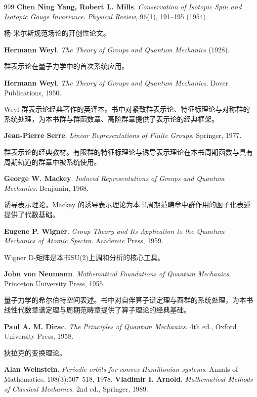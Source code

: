 \begin{thebibliography}{999}
 \textbf{Chen Ning Yang, Robert L. Mills}. \textit{Conservation of Isotopic Spin and Isotopic Gauge Invariance}. \textit{Physical Review}, 96(1), 191--195 (1954).

杨-米尔斯规范场论的开创性论文。

 \textbf{Hermann Weyl}. \textit{The Theory of Groups and Quantum Mechanics} (1928).

群表示论在量子力学中的首次系统应用。

 \textbf{Hermann Weyl}. \textit{The Theory of Groups and Quantum Mechanics}. Dover Publications, 1950.

Weyl 群表示论经典著作的英译本。书中对紧致群表示论、特征标理论与对称群的系统处理，为本书群与群函数章、高阶群章提供了表示论的经典框架。

 \textbf{Jean-Pierre Serre}. \textit{Linear Representations of Finite Groups}. Springer, 1977.

群表示论的经典教材。有限群的特征标理论与诱导表示理论在本书周期函数与具有周期轨道的群章中被系统使用。

 \textbf{George W. Mackey}. \textit{Induced Representations of Groups and Quantum Mechanics}. Benjamin, 1968.

诱导表示理论。Mackey 的诱导表示理论为本书周期范畴章中群作用的函子化表述提供了代数基础。

 \textbf{Eugene P. Wigner}. \textit{Group Theory and Its Application to the Quantum Mechanics of Atomic Spectra}. Academic Press, 1959.

Wigner D-矩阵是本书SU(2)上调和分析的核心工具。

 \textbf{John von Neumann}. \textit{Mathematical Foundations of Quantum Mechanics}. Princeton University Press, 1955.

量子力学的希尔伯特空间表述。书中对自伴算子谱定理与酉群的系统处理，为本书线性代数章谱定理与周期范畴章提供了算子理论的经典基础。

 \textbf{Paul A. M. Dirac}. \textit{The Principles of Quantum Mechanics}. 4th ed., Oxford University Press, 1958.

狄拉克的变换理论。

 \textbf{Alan Weinstein}. \textit{Periodic orbits for convex Hamiltonian systems}. Annals of Mathematics, 108(3):507--518, 1978.
 \textbf{Vladimir I. Arnold}. \textit{Mathematical Methods of Classical Mechanics}. 2nd ed., Springer, 1989.


\end{thebibliography}
